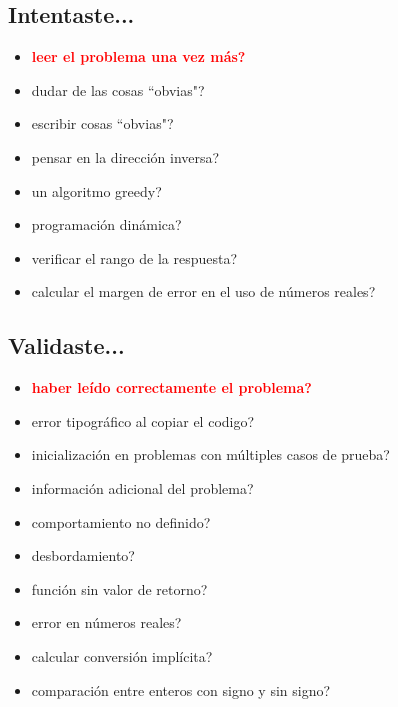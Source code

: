 \subsection{Intentaste...}

\begin{itemize}
    \item \textcolor{red}{\textbf{leer el problema una vez más?}}
    \item dudar de las cosas ``obvias"?
    \item escribir cosas ``obvias"?
    \item pensar en la dirección inversa?
    \item un algoritmo greedy?
    \item programación dinámica?
    \item verificar el rango de la respuesta?
    \item calcular el margen de error en el uso de números reales?
\end{itemize}

\subsection{Validaste...}

\begin{itemize}
    \item \textcolor{red}{\textbf{haber leído correctamente el problema?}}
    \item error tipográfico al copiar el codigo?
    \item inicialización en problemas con múltiples casos de prueba?
    \item información adicional del problema?
    \item comportamiento no definido?
    \item desbordamiento?
    \item función sin valor de retorno?
    \item error en números reales?
    \item calcular conversión implícita?
    \item comparación entre enteros con signo y sin signo?
\end{itemize}
